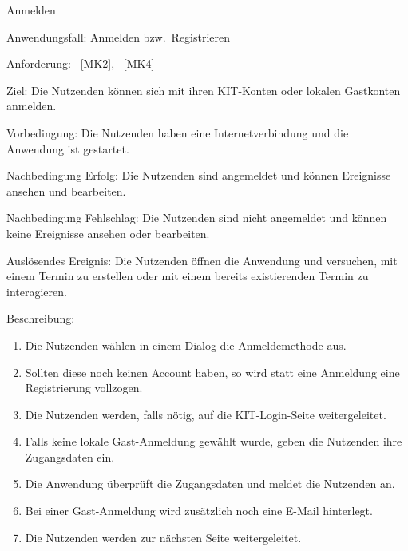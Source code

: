 \pagebreak

\begin{function}{20}{Anmelden}
    \item[Anwendungsfall:] Anmelden bzw.\ Registrieren
    \item[Anforderung:]~\ref{MK2}, ~\ref{MK4}
    \item[Ziel:] Die Nutzenden können sich mit ihren KIT-Konten oder lokalen Gastkonten anmelden.
    \item[Vorbedingung:] Die Nutzenden haben eine Internetverbindung und die Anwendung ist gestartet.
    \item[Nachbedingung Erfolg:] Die Nutzenden sind angemeldet und können Ereignisse ansehen und bearbeiten.
    \item[Nachbedingung Fehlschlag:] Die Nutzenden sind nicht angemeldet und können keine Ereignisse ansehen oder bearbeiten.
    \item[Auslösendes Ereignis:] Die Nutzenden öffnen die Anwendung und versuchen, mit einem Termin zu erstellen oder mit einem bereits existierenden Termin zu interagieren.
    \item[Beschreibung:] ~
    \begin{enumerate}
        \item Die Nutzenden wählen in einem Dialog die Anmeldemethode aus.
        \item Sollten diese noch keinen Account haben, so wird statt eine Anmeldung eine Registrierung vollzogen.
        \item Die Nutzenden werden, falls nötig, auf die KIT-Login-Seite weitergeleitet.
        \item Falls keine lokale Gast-Anmeldung gewählt wurde, geben die Nutzenden ihre Zugangsdaten ein.
        \item Die Anwendung überprüft die Zugangsdaten und meldet die Nutzenden an.
        \item Bei einer Gast-Anmeldung wird zusätzlich noch eine E-Mail hinterlegt.
        \item Die Nutzenden werden zur nächsten Seite weitergeleitet.
    \end{enumerate}
\end{function}

\pagebreak

